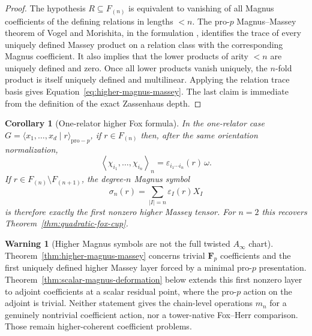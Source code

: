 \documentclass[11pt]{article}
\newtheorem{corollary}[theorem]{Corollary}
\theoremstyle{definition}
\newtheorem{warning}[theorem]{Warning}
\begin{document}
\begin{proof}
The hypothesis $R\subseteq F_{(n)}$ is equivalent to vanishing of all Magnus
coefficients of the defining relations in lengths $<n$.  The pro-$p$
Magnus--Massey theorem of Vogel and Morishita, in the formulation
\cite[Theorem~4.5]{GartnerMassey}, identifies the trace of every uniquely
defined Massey product on a relation class with the corresponding Magnus
coefficient.  It also implies that the lower products of arity $<n$ are
uniquely defined and zero.  Once all lower products vanish uniquely, the
$n$-fold product is itself uniquely defined and multilinear.  Applying the
relation trace basis gives Equation~\eqref{eq:higher-magnus-massey}.  The last
claim is immediate from the definition of the exact Zassenhaus depth.
\end{proof}

\begin{corollary}[One-relator higher Fox formula]\label{cor:one-relator-higher-massey}
In the one-relator case $G=\langle x_1,\ldots,x_d\mid r\rangle_{\mathrm{pro}-p}$,
if $r\in F_{(n)}$ then, after the same orientation normalization,
\[
 \left\langle
 \chi_{i_1},\ldots,\chi_{i_n}
 \right\rangle_n
 =\varepsilon_{i_1\cdots i_n}(r)\,\omega.
\]
If $r\in F_{(n)}\setminus F_{(n+1)}$, the degree-$n$ Magnus symbol
\[
 \sigma_n(r)=\sum_{|I|=n}\varepsilon_I(r)X_I
\]
is therefore exactly the first nonzero higher Massey tensor.  For $n=2$ this
recovers Theorem~\ref{thm:quadratic-fox-cup}.
\end{corollary}

\begin{warning}[Higher Magnus symbols are not the full twisted $A_\infty$ chart]\label{warn:higher-magnus-not-twisted}
Theorem~\ref{thm:higher-magnus-massey} concerns trivial $\mathbf F_p$
coefficients and the first uniquely defined higher Massey layer forced by a
minimal pro-$p$ presentation.  Theorem~\ref{thm:scalar-magnus-deformation}
below extends this first nonzero layer to adjoint coefficients at a scalar
residual point, where the pro-$p$ action on the adjoint is trivial.  Neither
statement gives the chain-level operations $m_n$ for a genuinely nontrivial
coefficient action, nor a tower-native Fox--Herr comparison.  Those remain
higher-coherent coefficient problems.
\end{warning}
\end{document}
